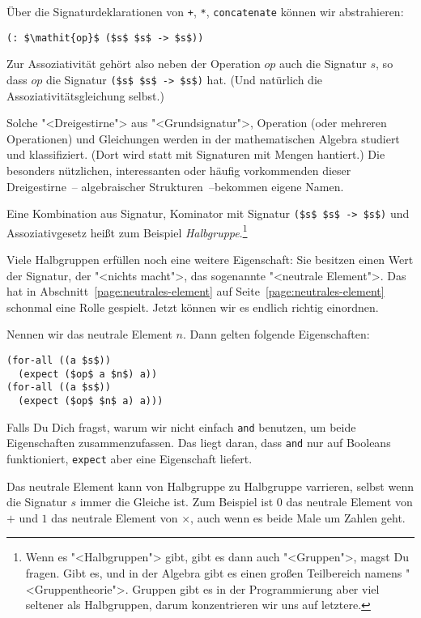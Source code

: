 Über die Signaturdeklarationen von \lstinline{+}, \lstinline{*},
\lstinline{concatenate} können wir abstrahieren:
%
\begin{lstlisting}
(: $\mathit{op}$ ($s$ $s$ -> $s$))
\end{lstlisting}
%
Zur Assoziativität gehört also neben der Operation $op$ auch die
Signatur $s$, so dass $op$ die Signatur \lstinline{($s$ $s$ -> $s$)}
hat.  (Und natürlich die Assoziativitätsgleichung selbst.)

Solche "<Dreigestirne"> aus "<Grundsignatur">, Operation (oder
mehreren Operationen) und Gleichungen werden in der mathematischen
Algebra studiert und klassifiziert.  (Dort wird statt
mit Signaturen mit Mengen hantiert.)  Die besonders nützlichen,
interessanten oder häufig vorkommenden dieser Dreigestirne~--
algebraischer Strukturen~--bekommen eigene Namen.

Eine Kombination aus Signatur, Kominator mit Signatur
\lstinline{($s$ $s$ -> $s$)}
und Assoziativgesetz heißt zum Beispiel
\textit{Halbgruppe}.\footnote{Wenn es "<Halbgruppen"> gibt,
gibt es dann auch "<Gruppen">, magst Du fragen.  Gibt es, und in der
Algebra gibt es einen großen Teilbereich namens "<Gruppentheorie">.
Gruppen gibt es in der Programmierung aber viel seltener als
Halbgruppen, darum konzentrieren wir uns auf letztere.}

Viele Halbgruppen erfüllen noch eine weitere Eigenschaft: Sie besitzen
einen Wert der Signatur, der "<nichts macht">, das sogenannte
"<neutrale Element">. Das hat in
Abschnitt~\ref{page:neutrales-element} auf
Seite~\ref{page:neutrales-element} schonmal eine Rolle gespielt.
Jetzt können wir es endlich richtig einordnen.

Nennen wir das neutrale Element $n$.  Dann gelten folgende
Eigenschaften:
%
\begin{lstlisting}
(for-all ((a $s$))
  (expect ($op$ a $n$) a))
(for-all ((a $s$))
  (expect ($op$ $n$ a) a)))
\end{lstlisting}
%
Falls Du Dich fragst, warum wir nicht einfach \lstinline{and}
benutzen, um beide Eigenschaften zusammenzufassen.  Das liegt daran,
dass \lstinline{and} nur auf Booleans funktioniert, \lstinline{expect}
aber eine Eigenschaft liefert.

Das neutrale Element kann von Halbgruppe zu Halbgruppe varrieren,
selbst wenn die Signatur $s$ immer die Gleiche ist.  Zum Beispiel ist
$0$ das neutrale Element von $+$ und $1$ das neutrale Element von
$\times$, auch wenn es beide Male um Zahlen geht.


